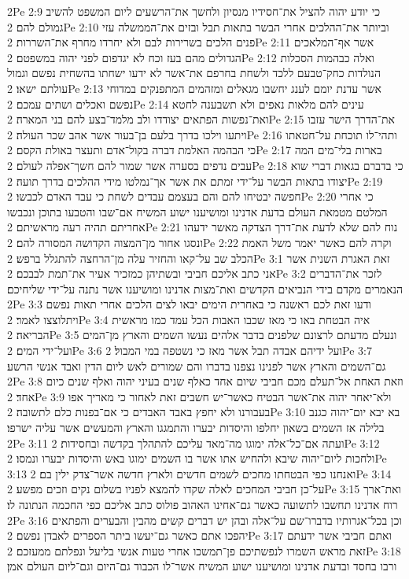 2Pe 2:9  כי יודע יהוה להציל את־חסידיו מנסיון ולחשך את־הרשעים ליום המשפט להשיב גמולם להם׃
2Pe 2:10  וביותר את־ההלכים אחרי הבשר בתאות תבל ובזים את־הממשלה עזי פנים הלכים בשרירות לבם ולא יחרדו מחרף את־השררות׃
2Pe 2:11  אשר אף־המלאכים הגדולים מהם בעז וכח לא יגדפום לפני יהוה במשפטם׃
2Pe 2:12  ואלה כבהמות הסכלות הנולדות כחק־טבעם ללכד ולשחת בחרפם את־אשר לא ידעו ישחתו בהשחית נפשם וגמול עולתם ישאו׃
2Pe 2:13  אשר עדנת יומם לענג יחשבו מגאלים ומזהמים המתפנקים במדוחי נפשם ואכלים ושתים עמכם׃
2Pe 2:14  עינים להם מלאות נאפים ולא תשבענה לחטא ואת־נפשות הפתאים יצודדו ולב מלמד־בצע להם בני המארה׃
2Pe 2:15  את־הדרך הישר עזבו ויתעו וילכו בדרך בלעם בן־בעור אשר אהב שכר העולה׃
2Pe 2:16  ותהי־לו תוכחת על־חטאתו כי הבהמה האלמת דברה בקול־אדם ותעצר באולת הקסם׃
2Pe 2:17  בארות בלי־מים המה עבים נדפים בסערה אשר שמור להם חשך־אפלה לעולם׃
2Pe 2:18  כי בדברם בגאות דברי שוא יצודו בתאות הבשר על־ידי זמתם את אשר אך־נמלטו מידי ההלכים בדרך תועה׃
2Pe 2:19  חפשה יבטיחו להם והם בעצמם עבדים לשחת כי עבד האדם לכבשו׃
2Pe 2:20  כי אחרי המלטם מטמאת העולם בדעת אדנינו ומושיענו ישוע המשיח אם־שבו והטבעו בתוכן ונכבשו אחריתם תהיה רעה מראשיתם׃
2Pe 2:21  נוח להם שלא לדעת את־דרך הצדקה מאשר ידעהו ונסגו אחור מן־המצוה הקדושה המסורה להם׃
2Pe 2:22  וקרה להם כאשר יאמר משל האמת הכלב שב על־קאו והחזיר עלה מן־הרחצה להתגלל ברפש׃
2Pe 3:1  זאת האגרת השנית אשר אני כתב אליכם חביבי ובשתיהן כמזכיר אעיר את־תמת לבבכם׃
2Pe 3:2  לזכר את־הדברים הנאמרים מקדם בידי הנביאים הקדשים ואת־מצות אדנינו ומושיענו אשר נתנה על־ידי שליחיכם׃
2Pe 3:3  ודעו זאת לכם ראשנה כי באחרית הימים יבאו לצים הלכים אחרי תאות נפשם ויתלוצצו לאמר׃
2Pe 3:4  איה הבטחת באו כי מאז שכבו האבות הכל עמד כמו מראשית הבריאה׃
2Pe 3:5  ונעלם מדעתם לרצונם שלפנים בדבר אלהים נעשו השמים והארץ מן־המים ועל־ידי המים׃
2Pe 3:6  ועל ידיהם אבדה תבל אשר מאז כי נשטפה במי המבול׃
2Pe 3:7  גם־השמים והארץ אשר לפנינו נצפנו בדברו והם שמורים לאש ליום הדין ואבד אנשי הרשע׃
2Pe 3:8  וזאת האחת אל־תעלם מכם חביבי שיום אחד כאלף שנים בעיני יהוה ואלף שנים כיום אחד׃
2Pe 3:9  ולא־יאחר יהוה את־אשר הבטיח כאשר־יש חשבים זאת לאחור כי מאריך אפו בעבורנו ולא יחפץ באבד האבדים כי אם־בפנות כלם לתשובה׃
2Pe 3:10  בא יבא יום־יהוה כגנב בלילה אז השמים בשאון יחלפו והיסדות יבערו והתמגגו והארץ והמעשים אשר עליה ישרפו׃
2Pe 3:11  ועתה אם־כל־אלה ימוגו מה־מאד עליכם להתהלך בקדשה ובחסידות׃
2Pe 3:12  ולחכות ליום־יהוה שיבא ולהחיש אתו אשר בו השמים ימוגו באש והיסדות יבערו ונמסו׃
2Pe 3:13  ואנחנו כפי הבטחתו מחכים לשמים חדשים ולארץ חדשה אשר־צדק ילין בם׃
2Pe 3:14  על־כן חביבי המחכים לאלה שקדו להמצא לפניו בשלום נקים וזכים מפשע׃
2Pe 3:15  ואת־ארך רוח אדנינו תחשבו לתשועה כאשר גם־אחינו האהוב פולוס כתב אליכם כפי החכמה הנתונה לו׃
2Pe 3:16  וכן בכל־אגרותיו בדברו־שם על־אלה ובהן יש דברים קשים מהבין והבערים והפתאים יהפכו אתם כאשר גם־יעשו ביתר הספרים לאבדן נפשם׃
2Pe 3:17  ואתם חביבי אשר ידעתם זאת מראש השמרו לנפשתיכם פן־תמשכו אחרי טעות אנשי בליעל ונפלתם ממעזכם׃
2Pe 3:18  ורבו בחסד ובדעת אדנינו ומושיענו ישוע המשיח אשר־לו הכבוד גם־היום וגם־ליום העולם אמן׃


